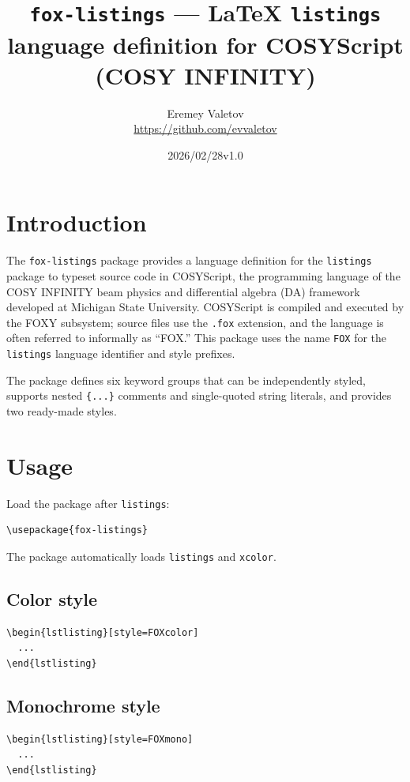 \documentclass{article}
\title{\texttt{fox-listings} --- \LaTeX{} \texttt{listings} language
  definition for COSYScript (COSY INFINITY)}
\author{Eremey Valetov\\\url{https://github.com/evvaletov}}
\date{2026/02/28\quad v1.0}
\begin{document}
\maketitle

\section{Introduction}

The \texttt{fox-listings} package provides a language definition for the
\texttt{listings} package to typeset source code in COSYScript, the
programming language of the COSY INFINITY beam physics and differential
algebra (DA) framework developed at Michigan State University.
COSYScript is compiled and executed by the FOXY subsystem; source files
use the \texttt{.fox} extension, and the language is often referred to
informally as ``FOX.''  This package uses the name \texttt{FOX} for the
\texttt{listings} language identifier and style prefixes.

The package defines six keyword groups that can be independently styled,
supports nested \texttt{\{...\}} comments and single-quoted string literals,
and provides two ready-made styles.

\section{Usage}

Load the package after \texttt{listings}:

\begin{verbatim}
\usepackage{fox-listings}
\end{verbatim}

The package automatically loads \texttt{listings} and \texttt{xcolor}.

\subsection{Color style}

\begin{verbatim}
\begin{lstlisting}[style=FOXcolor]
  ...
\end{lstlisting}
\end{verbatim}

\subsection{Monochrome style}

\begin{verbatim}
\begin{lstlisting}[style=FOXmono]
  ...
\end{lstlisting}
\end{verbatim}
\end{document}
